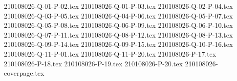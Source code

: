 \documentclass{article}                              %
\begin{document}
{210108026-Q-01-P-02.tex}
{210108026-Q-01-P-03.tex}
{210108026-Q-02-P-04.tex}
{210108026-Q-03-P-05.tex}
{210108026-Q-04-P-06.tex}
{210108026-Q-05-P-07.tex}
{210108026-Q-05-P-08.tex}
{210108026-Q-06-P-09.tex}
{210108026-Q-06-P-10.tex}
{210108026-Q-07-P-11.tex}
{210108026-Q-08-P-12.tex}
{210108026-Q-08-P-13.tex}
{210108026-Q-09-P-14.tex}
{210108026-Q-09-P-15.tex}
{210108026-Q-10-P-16.tex}
{210108026-Q-11-P-01.tex}
{210108026-Q-11-P-20.tex}
{210108026-P-17.tex}
{210108026-P-18.tex}
{210108026-P-19.tex}
{210108026-P-20.tex}
{210108026-coverpage.tex}
\end{document}
